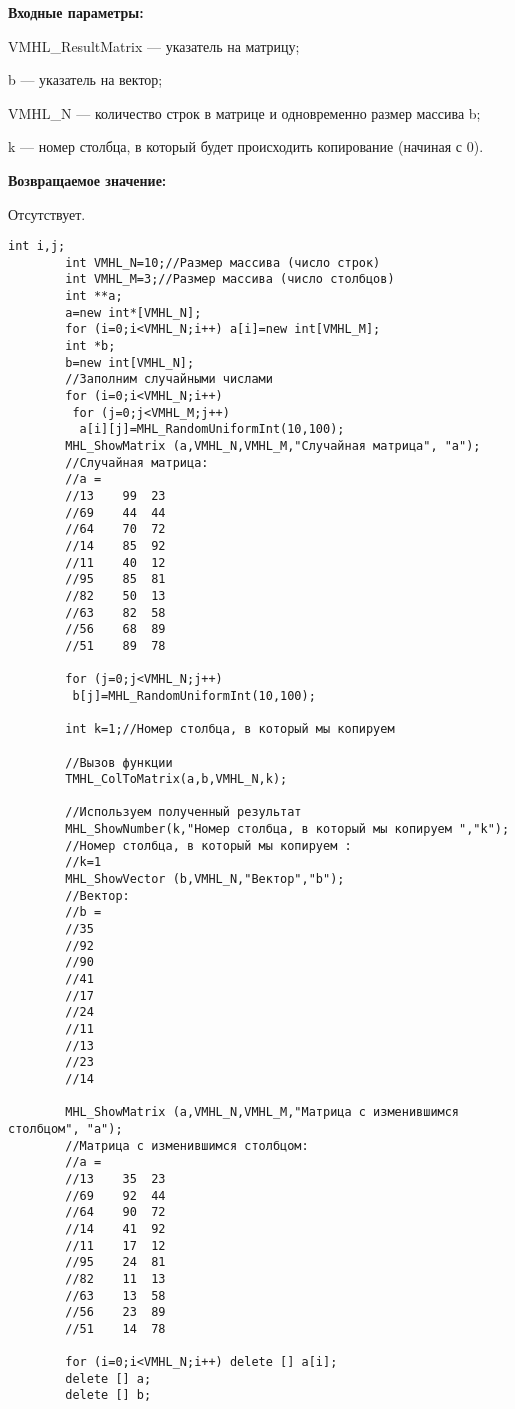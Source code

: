 \documentclass[a4paper,12pt]{article}
\begin{document}
\textbf{Входные параметры:}  
 
VMHL\_ResultMatrix --- указатель на матрицу;
 
b --- указатель на вектор;
 
VMHL\_N --- количество строк в матрице и одновременно размер массива b;
 
k --- номер столбца, в который будет происходить копирование (начиная с 0).

\textbf{Возвращаемое значение:}

Отсутствует.


\begin{lstlisting}[label=code_use_TMHL_ColToMatrix,caption=Пример использования]
        int i,j;
        int VMHL_N=10;//Размер массива (число строк)
        int VMHL_M=3;//Размер массива (число столбцов)
        int **a;
        a=new int*[VMHL_N];
        for (i=0;i<VMHL_N;i++) a[i]=new int[VMHL_M];
        int *b;
        b=new int[VMHL_N];
        //Заполним случайными числами
        for (i=0;i<VMHL_N;i++)
         for (j=0;j<VMHL_M;j++)
          a[i][j]=MHL_RandomUniformInt(10,100);
        MHL_ShowMatrix (a,VMHL_N,VMHL_M,"Случайная матрица", "a");
        //Случайная матрица:
        //a =
        //13	99	23
        //69	44	44
        //64	70	72
        //14	85	92
        //11	40	12
        //95	85	81
        //82	50	13
        //63	82	58
        //56	68	89
        //51	89	78

        for (j=0;j<VMHL_N;j++)
         b[j]=MHL_RandomUniformInt(10,100);

        int k=1;//Номер столбца, в который мы копируем

        //Вызов функции
        TMHL_ColToMatrix(a,b,VMHL_N,k);

        //Используем полученный результат
        MHL_ShowNumber(k,"Номер столбца, в который мы копируем ","k");
        //Номер столбца, в который мы копируем :
        //k=1
        MHL_ShowVector (b,VMHL_N,"Вектор","b");
        //Вектор:
        //b =
        //35
        //92
        //90
        //41
        //17
        //24
        //11
        //13
        //23
        //14

        MHL_ShowMatrix (a,VMHL_N,VMHL_M,"Матрица с изменившимся столбцом", "a");
        //Матрица с изменившимся столбцом:
        //a =
        //13	35	23
        //69	92	44
        //64	90	72
        //14	41	92
        //11	17	12
        //95	24	81
        //82	11	13
        //63	13	58
        //56	23	89
        //51	14	78

        for (i=0;i<VMHL_N;i++) delete [] a[i];
        delete [] a;
        delete [] b;
\end{lstlisting}
\end{document}

